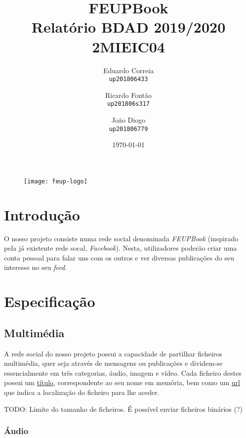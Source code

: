 \documentclass{report}
\begin{document}
\title{\Huge{\textbf{FEUPBook}} \\ Relatório BDAD 2019/2020 \\ \Large{2MIEIC04}}
\author{Eduardo Correia \\ \texttt{up201806433} \and
	    Ricardo Fontão \\  \texttt{up201806s317} \and
        João Diogo \\ \texttt{up201806779}}
\date{\today}

\begin{figure}[b] %
    \centering
    \texttt{[image: feup-logo]}
\end{figure}

\maketitle

\tableofcontents

\chapter{Introdução}

O nosso projeto consiste numa rede social denominada \textit{FEUPBook} (inspirado pela já existente rede socal,  \textit{Facebook}). Nesta, utilizadores poderão criar uma conta pessoal para falar uns com os outros e ver diversas publicações do seu interesse no seu \textit{feed}.

\chapter{Especificação} 

\section{Multimédia}

A rede social do nosso projeto possui a capacidade de partilhar ficheiros multimédia, quer seja através de mensagens ou publicações e dividem-se essencialmente em três categorias, áudio, imagem e vídeo. Cada ficheiro destes possui um \underline{título}, correspondente ao seu nome em memória, bem como um \underline{url} que indica a localização do ficheiro para lhe aceder. \par

TODO: Limite do tamanho de ficheiros. É possível enviar ficheiros binários (?)

\subsection{Áudio}
\end{document}
